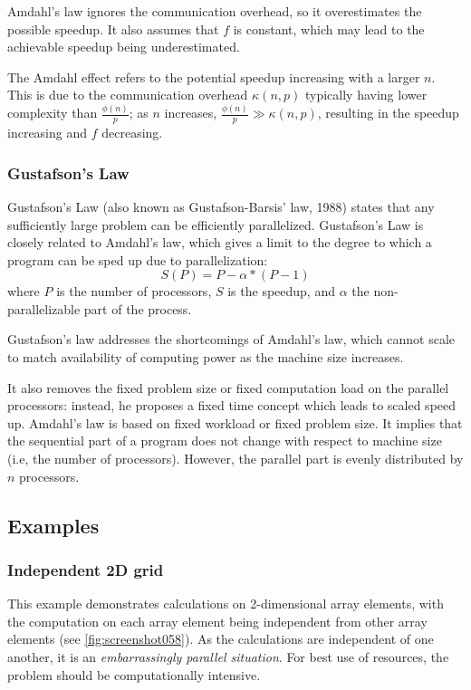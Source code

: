 Amdahl's law ignores the communication overhead, so it overestimates the possible speedup. It also assumes that $f$ is constant, which may lead to the achievable speedup being underestimated. 

The Amdahl effect refers to the potential speedup increasing with a larger $n$. This is due to the communication overhead $\kappa(n,p)$ typically having lower complexity than $\frac{\phi(n)}{p}$; as $n$ increases, $\frac{\phi(n)}{p} \gg \kappa(n,p)$, resulting in the speedup increasing and $f$ decreasing.

\subsubsection{Gustafson's Law}
Gustafson's Law (also known as Gustafson-Barsis' law, 1988) states that any sufficiently large problem can be efficiently parallelized. Gustafson's Law is closely related to Amdahl's law, which gives a limit to the degree to which a program can be sped up due to parallelization:
\[ S(P) = P-\alpha * (P - 1) \]
where $P$ is the number of processors, $S$ is the speedup, and $\alpha$ the non-parallelizable part of the process.

Gustafson's law addresses the shortcomings of Amdahl's law, which cannot scale to match availability of computing power as the machine size increases.  

It also removes the fixed problem size or fixed computation load on the parallel processors: instead, he proposes a fixed time concept which leads to scaled speed up. Amdahl's law is based on fixed workload or fixed problem size. It implies that the sequential part of a program does not change with respect to machine size (i.e, the number of processors). However, the parallel part is evenly distributed by $n$ processors. 

\subsection{Examples}
\subsubsection{Independent 2D grid}
This example demonstrates calculations on 2-dimensional array elements, with the computation on each array element being independent from other array elements (see \autoref{fig:screenshot058}).  As the calculations are independent of one another, it is an \textit{embarrassingly parallel situation}. For best use of resources, the problem should be computationally intensive.

